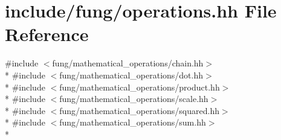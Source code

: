 \hypertarget{operations_8hh}{}\section{include/fung/operations.hh File Reference}
\label{operations_8hh}
{\ttfamily \#include $<$fung/mathematical\+\_\+operations/chain.\+hh$>$}\\*
{\ttfamily \#include $<$fung/mathematical\+\_\+operations/dot.\+hh$>$}\\*
{\ttfamily \#include $<$fung/mathematical\+\_\+operations/product.\+hh$>$}\\*
{\ttfamily \#include $<$fung/mathematical\+\_\+operations/scale.\+hh$>$}\\*
{\ttfamily \#include $<$fung/mathematical\+\_\+operations/squared.\+hh$>$}\\*
{\ttfamily \#include $<$fung/mathematical\+\_\+operations/sum.\+hh$>$}\\*

